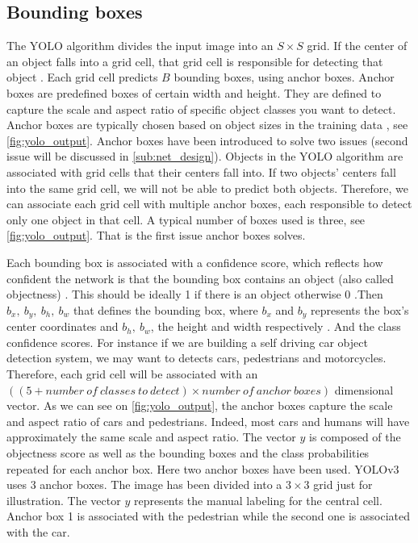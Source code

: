 \subsection{Bounding boxes} \label{subsection:bbox}
The YOLO algorithm divides the input image into an $S \times S$ grid. If the center of an object falls into a grid cell, that grid cell is responsible
for detecting that object \cite{YOLOv1}. Each grid cell predicts $B$ bounding boxes, using anchor boxes. Anchor boxes are predefined boxes of certain width and height.
They are defined to capture the scale and aspect ratio of specific object classes you want to detect. Anchor boxes are typically chosen based on object
sizes in the training data \cite{MWAB}, see \cref{fig:yolo_output}. Anchor boxes have been introduced to solve two issues (second issue will be discussed in \cref{sub:net_design}). Objects in the YOLO algorithm are associated with grid cells that their
centers fall into. If two objects' centers fall into the same grid cell, we will not be able to predict both objects. Therefore, we can associate
each grid cell with multiple anchor boxes, each responsible to detect only one object in that cell. A typical number of boxes used is three, see \cref{fig:yolo_output}. That is the first issue anchor boxes solves.

Each bounding box is associated with a confidence score, which reflects how confident the network is that the bounding box contains an object (also called objectness) \cite{YOLOv1}.
This should be ideally 1 if there is an object otherwise 0 \cite{YOLOv3}.Then $b_{x},\ b_{y},\ b_{h},\ b_{w}$ that defines the bounding box, where $b_{x}$ and $b_{y}$ represents the box's
center coordinates and $b_{h},\ b_{w}$, the height and width respectively \cite{CERA}. And the class confidence scores. For instance if we are building a self driving car object detection system, we may want to detects cars, pedestrians and motorcycles. Therefore, each grid cell will be associated with
an $((5 + number\ of\ classes\ to\ detect) \times number\ of\ anchor\ boxes)$ dimensional vector. As we can see on \cref{fig:yolo_output}, the anchor boxes capture the scale and aspect ratio of cars and pedestrians. Indeed, most cars and humans will have approximately the same scale and aspect ratio. The vector $y$ is composed of the objectness score as well as the bounding boxes and the class probabilities repeated for each anchor box. Here two anchor boxes have been used. YOLOv3 uses 3 anchor boxes. The image has been divided into a $3 \times 3$ grid just for illustration. The vector $y$ represents the manual labeling for the central cell. Anchor box 1 is associated with the pedestrian while the second one is associated with the car.

